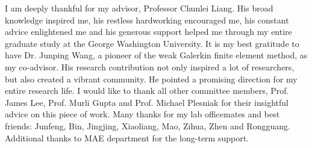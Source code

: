 \begin{acknowledgements}

I am deeply thankful for my advisor, Professor Chunlei Liang. His broad knowledge inspired me, his restless hardworking  encouraged me, his constant advice enlightened me and his generous support helped me through my entire graduate study at the George Washington University. It is my best gratitude to have Dr. Junping Wang, a pioneer of the weak Galerkin finite element method, as my co-advisor. His research contribution not only inspired a lot of researchers, but also created a vibrant community. He pointed a promising direction for my entire research life. I would like to thank all other committee members, Prof. James Lee, Prof. Murli Gupta and Prof. Michael Plesniak for their insightful advice on this piece of work. Many thanks for my lab officemates and best friends: Junfeng, Bin, Jingjing, Xiaoliang, Mao, Zihua, Zhen and Rongguang. Additional thanks to MAE department for the long-term support.

\end{acknowledgements}
